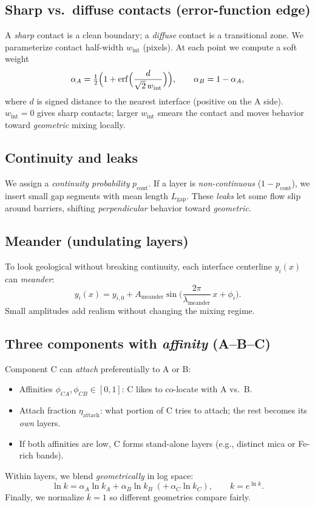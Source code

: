 \documentclass[11pt,a4paper]{article}
\begin{document}
\subsection*{Sharp vs.\ diffuse contacts (error-function edge)}
A \emph{sharp} contact is a clean boundary; a \emph{diffuse} contact is a transitional zone. We parameterize contact half-width $w_{\text{int}}$ (pixels). At each point we compute a soft weight
\[
\alpha_A = \tfrac12\Big(1 + \erf\!\Big(\frac{d}{\sqrt{2}\,w_{\text{int}}}\Big)\Big),\qquad \alpha_B=1-\alpha_A,
\]
where $d$ is signed distance to the nearest interface (positive on the A side). $w_{\text{int}}=0$ gives sharp contacts; larger $w_{\text{int}}$ smears the contact and moves behavior toward \emph{geometric} mixing locally.

\subsection*{Continuity and leaks}
We assign a \emph{continuity probability} $p_{\text{cont}}$. If a layer is \emph{non-continuous} ($1-p_{\text{cont}}$), we insert small gap segments with mean length $L_{\text{gap}}$. These \emph{leaks} let some flow slip around barriers, shifting \emph{perpendicular} behavior toward \emph{geometric}.

\subsection*{Meander (undulating layers)}
To look geological without breaking continuity, each interface centerline $y_i(x)$ can \emph{meander}:
\[
y_i(x) = y_{i,0} + A_{\text{meander}}\sin\Big(\frac{2\pi}{\lambda_{\text{meander}}}\,x + \phi_i\Big).
\]
Small amplitudes add realism without changing the mixing regime.

\subsection*{Three components with \emph{affinity} (A--B--C)}
Component C can \emph{attach} preferentially to A or B:
\begin{itemize}[leftmargin=*]
\item Affinities $\phi_{CA},\phi_{CB}\in[0,1]$: C likes to co-locate with A vs.\ B.
\item Attach fraction $\eta_{\text{attach}}$: what portion of C tries to attach; the rest becomes its \emph{own} layers.
\item If both affinities are low, C forms stand-alone layers (e.g., distinct mica or Fe-rich bands).
\end{itemize}
Within layers, we blend \emph{geometrically} in log space:
\[
\ln k = \alpha_A \ln k_A + \alpha_B \ln k_B \;(+\,\alpha_C \ln k_C),\qquad k = e^{\ln k}.
\]
Finally, we normalize $\overline{k}=1$ so different geometries compare fairly.
\end{document}

